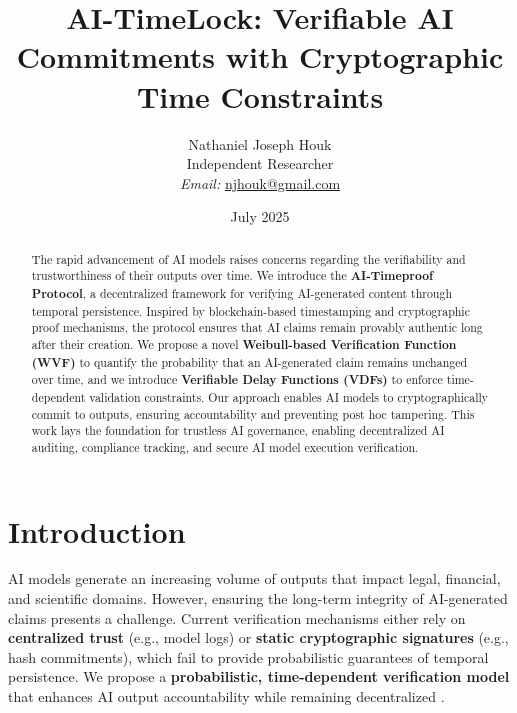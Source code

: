 \documentclass[12pt]{report}
\begin{document}
\title{AI-TimeLock: Verifiable AI Commitments with Cryptographic Time Constraints}
\author{Nathaniel Joseph Houk\\
Independent Researcher\\
\textit{Email:} \href{mailto:njhouk@gmail.com}{njhouk@gmail.com}}
\date{July 2025}
\maketitle

\begin{abstract}
The rapid advancement of AI models raises concerns regarding the verifiability and trustworthiness of their outputs over time. We introduce the \textbf{AI-Timeproof Protocol}, a decentralized framework for verifying AI-generated content through temporal persistence. Inspired by blockchain-based timestamping and cryptographic proof mechanisms, the protocol ensures that AI claims remain provably authentic long after their creation. We propose a novel \textbf{Weibull-based Verification Function (WVF)} to quantify the probability that an AI-generated claim remains unchanged over time, and we introduce \textbf{Verifiable Delay Functions (VDFs)} to enforce time-dependent validation constraints. Our approach enables AI models to cryptographically commit to outputs, ensuring accountability and preventing post hoc tampering. This work lays the foundation for trustless AI governance, enabling decentralized AI auditing, compliance tracking, and secure AI model execution verification.
\end{abstract}

\section{Introduction}

AI models generate an increasing volume of outputs that impact legal, financial, and scientific domains. However, ensuring the long-term integrity of AI-generated claims presents a challenge. Current verification mechanisms either rely on \textbf{centralized trust} (e.g., model logs) or \textbf{static cryptographic signatures} (e.g., hash commitments), which fail to provide probabilistic guarantees of temporal persistence. We propose a \textbf{probabilistic, time-dependent verification model} that enhances AI output accountability while remaining decentralized \cite{houk2025}.
\end{document}
